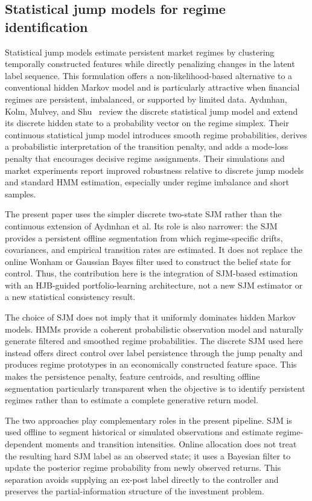 \documentclass[a4paper,10pt]{article}
\begin{document}
\subsection{Statistical jump models for regime identification}

Statistical jump models estimate persistent market regimes by clustering temporally constructed features while directly penalizing changes in the latent label sequence. This formulation offers a non-likelihood-based alternative to a conventional hidden Markov model and is particularly attractive when financial regimes are persistent, imbalanced, or supported by limited data. Ayd{\i}nhan, Kolm, Mulvey, and Shu~\cite{aydinhan2024} review the discrete statistical jump model and extend its discrete hidden state to a probability vector on the regime simplex. Their continuous statistical jump model introduces smooth regime probabilities, derives a probabilistic interpretation of the transition penalty, and adds a mode-loss penalty that encourages decisive regime assignments. Their simulations and market experiments report improved robustness relative to discrete jump models and standard HMM estimation, especially under regime imbalance and short samples.

The present paper uses the simpler discrete two-state SJM rather than the continuous extension of Ayd{\i}nhan et al. Its role is also narrower: the SJM provides a persistent offline segmentation from which regime-specific drifts, covariances, and empirical transition rates are estimated. It does not replace the online Wonham or Gaussian Bayes filter used to construct the belief state for control. Thus, the contribution here is the integration of SJM-based estimation with an HJB-guided portfolio-learning architecture, not a new SJM estimator or a new statistical consistency result.

The choice of SJM does not imply that it uniformly dominates hidden Markov models. HMMs provide a coherent probabilistic observation model and naturally generate filtered and smoothed regime probabilities. The discrete SJM used here instead offers direct control over label persistence through the jump penalty and produces regime prototypes in an economically constructed feature space. This makes the persistence penalty, feature centroids, and resulting offline segmentation particularly transparent when the objective is to identify persistent regimes rather than to estimate a complete generative return model.

The two approaches play complementary roles in the present pipeline. SJM is used offline to segment historical or simulated observations and estimate regime-dependent moments and transition intensities. Online allocation does not treat the resulting hard SJM label as an observed state; it uses a Bayesian filter to update the posterior regime probability from newly observed returns. This separation avoids supplying an ex-post label directly to the controller and preserves the partial-information structure of the investment problem.
\end{document}
